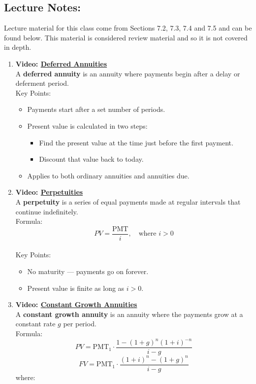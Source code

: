 \documentclass[
]{book}
\providecommand{\tightlist}{%
  \setlength{\itemsep}{0pt}\setlength{\parskip}{0pt}}
\begin{document}
\subsection*{Lecture Notes:}\label{lecture-notes-17}

Lecture material for this class come from Sections 7.2, 7.3, 7.4 and 7.5 and can be found below. This material is considered review material and so it is not covered in depth.

\begin{enumerate}
\def\labelenumi{\arabic{enumi}.}
\tightlist
\item
  \textbf{Video: \href{https://youtu.be/S5UgF1tzz6s}{Deferred Annuities}}\\
  A \textbf{deferred annuity} is an annuity where payments begin after a delay or deferment period.\\
  Key Points:

  \begin{itemize}
  \tightlist
  \item
    Payments start after a set number of periods.
  \item
    Present value is calculated in two steps:

    \begin{itemize}
    \tightlist
    \item
      Find the present value at the time just before the first payment.
    \item
      Discount that value back to today.
    \end{itemize}
  \item
    Applies to both ordinary annuities and annuities due.
  \end{itemize}
\item
  \textbf{Video: \href{https://youtu.be/CNq74zq-Jns}{Perpetuities}}\\
  A \textbf{perpetuity} is a series of equal payments made at regular intervals that continue indefinitely.\\
  Formula:
  \[
  PV = \frac{\text{PMT}}{i}, \quad \text{where } i > 0
  \]\\
  Key Points:

  \begin{itemize}
  \tightlist
  \item
    No maturity --- payments go on forever.
  \item
    Present value is finite as long as \(i > 0\).
  \end{itemize}
\item
  \textbf{Video: \href{https://youtu.be/ooUss4RfLHI}{Constant Growth Annuities}}\\
  A \textbf{constant growth annuity} is an annuity where the payments grow at a constant rate \(g\) per period.\\
  Formula:
  \[
  PV = \text{PMT}_1 \cdot \frac{1 - (1+g)^n(1+i)^{-n}}{i-g}
  \]
  \[
  FV = \text{PMT}_1 \cdot \frac{(1+i)^n- (1+g)^n}{i-g}
  \]
  where:


\end{enumerate}
\end{document}
